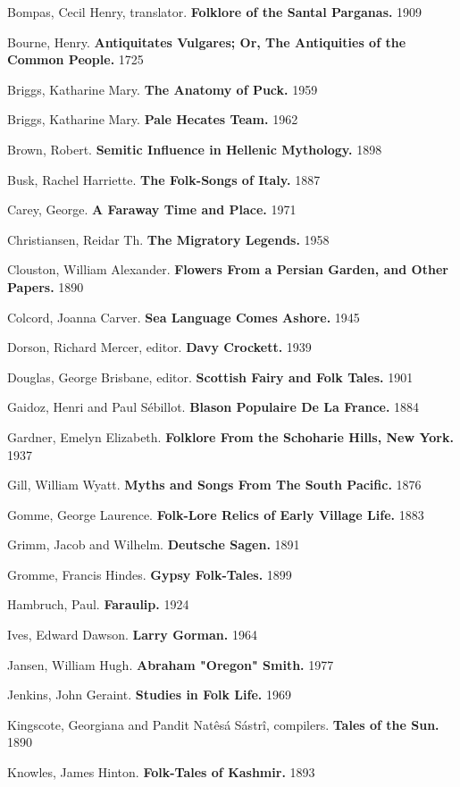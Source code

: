 \documentclass[14pt,a4paper]{memoir}
\begin{document}
Bompas, Cecil Henry, translator. \textbf{Folklore of the Santal
Parganas.} 1909

Bourne, Henry. \textbf{Antiquitates Vulgares; Or, The Antiquities of the
Common People.} 1725

Briggs, Katharine Mary. \textbf{The Anatomy of Puck.} 1959

Briggs, Katharine Mary. \textbf{Pale Hecate\textquotesingle s Team.}
1962

Brown, Robert. \textbf{Semitic Influence in Hellenic Mythology.} 1898

Busk, Rachel Harriette. \textbf{The Folk-Songs of Italy.} 1887

Carey, George. \textbf{A Faraway Time and Place.} 1971

Christiansen, Reidar Th. \textbf{The Migratory Legends.} 1958

Clouston, William Alexander. \textbf{Flowers From a Persian Garden, and
Other Papers.} 1890

Colcord, Joanna Carver. \textbf{Sea Language Comes Ashore.} 1945

Dorson, Richard Mercer, editor. \textbf{Davy Crockett.} 1939

Douglas, George Brisbane, editor. \textbf{Scottish Fairy and Folk
Tales.} 1901

Gaidoz, Henri and Paul Sébillot. \textbf{Blason Populaire De La France.}
1884

Gardner, Emelyn Elizabeth. \textbf{Folklore From the Schoharie Hills,
New York.} 1937

Gill, William Wyatt. \textbf{Myths and Songs From The South Pacific.}
1876

Gomme, George Laurence. \textbf{Folk-Lore Relics of Early Village Life.}
1883

Grimm, Jacob and Wilhelm. \textbf{Deutsche Sagen.} 1891

Gromme, Francis Hindes. \textbf{Gypsy Folk-Tales.} 1899

Hambruch, Paul. \textbf{Faraulip.} 1924

Ives, Edward Dawson. \textbf{Larry Gorman.} 1964

Jansen, William Hugh. \textbf{Abraham "Oregon" Smith.} 1977

Jenkins, John Geraint. \textbf{Studies in Folk Life.} 1969

Kingscote, Georgiana and Pandit Natêsá Sástrî, compilers. \textbf{Tales
of the Sun.} 1890

Knowles, James Hinton. \textbf{Folk-Tales of Kashmir.} 1893
\end{document}
